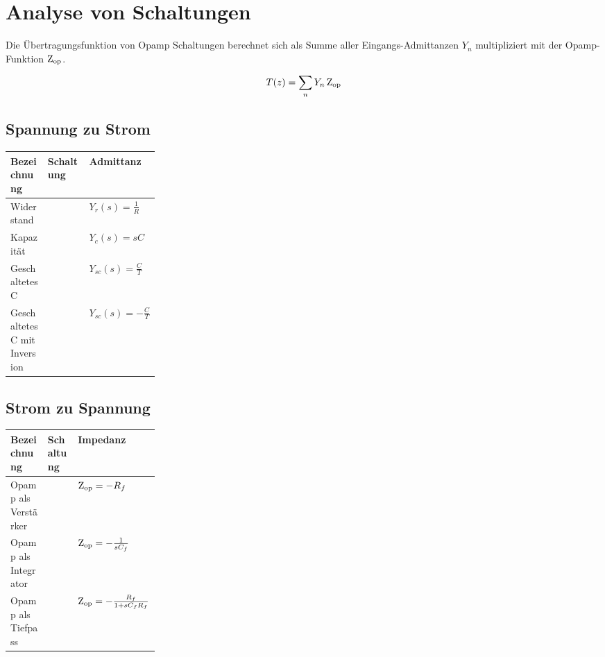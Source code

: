 \section{Analyse von Schaltungen}
Die Übertragungsfunktion von Opamp Schaltungen berechnet sich als 
Summe aller Eingangs-Admittanzen $Y_n$ multipliziert mit der Opamp-Funktion
$\operatorname{Z_{\text{op}}}$. 
\begin{multicols}{2}
	\begin{center}
		
	\end{center}
	\vfill
	\columnbreak
	\hspace{2cm}
	\begin{equation*}
		T(z) = \sum\limits_{n} Y_{n} \operatorname{Z_{\text{op}}}
	\end{equation*}
\end{multicols}

\subsection{Spannung zu Strom}

\begin{tabularx}{\linewidth}{p{0.25\linewidth}XX}
	\textbf{Bezeichnung} & \textbf{Schaltung} & \textbf{Admittanz} \\ \hline
	Widerstand &  & $Y_{r}(s) = \frac{1}{R}$ \\
	Kapazität &  & $Y_{c}(s) = sC$ \\
	Geschaltetes C &  & $Y_{sc}(s) = \frac{C}{T}$ \\
	Geschaltetes C mit Inversion &  & $Y_{sc}(s) = -\frac{C}{T}$ \\
	\hline
\end{tabularx}

\subsection{Strom zu Spannung}

\begin{tabularx}{\linewidth}{p{0.25\linewidth}XX}
	\textbf{Bezeichnung} & \textbf{Schaltung} & \textbf{Impedanz} \\ \hline
	Opamp als Verstärker &  & $\operatorname{Z_{\text{op}}} = -R_f$ \\
	Opamp als Integrator &  & $\operatorname{Z_{\text{op}}} = - \frac{1}{s C_f}$ \\
	Opamp als Tiefpass &  & $\operatorname{Z_{\text{op}}} = - \frac{R_f}{1+s C_f R_f}$  \\
	\hline
\end{tabularx}

